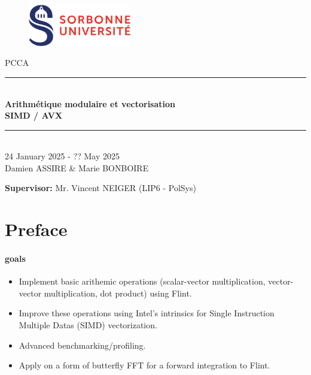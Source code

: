 \documentclass[a4paper]{article}
\begin{document}
\thispagestyle{plain}
\begin{titlepage}
    \begin{figure}[h]
        \centering
        \includegraphics[width=0.4\textwidth]{su.png}
    \end{figure}
    \vspace{1cm}

    \begin{center}
        {\LARGE PCCA}\\[0.3cm]
        \rule{\linewidth}{0.5mm} \\[0.4cm]
        {\huge \textbf{Arithmétique modulaire et vectorisation\\ SIMD / AVX}}\\[0.4cm]
        \rule{\linewidth}{0.5mm} \\[1cm]
        {\large 24 January 2025 - ?? May 2025}\\[3cm]

        {\Large Damien ASSIRE \& Marie BONBOIRE}


    \end{center}

    \vfill
\begin{flushleft}{\large
    \textbf{Supervisor:} Mr. Vincent NEIGER (LIP6 - PolSys)\\
    }
\end{flushleft}
\end{titlepage}
\newpage

\tableofcontents
\newpage

\section{Preface}

\paragraph{goals}
\begin{itemize}
    \item Implement basic arithemic operations (scalar-vector multiplication, vector-vector multiplication, dot product) using Flint.
    \item Improve these operations using Intel's intrinsics for Single Instruction Multiple Datas (SIMD) vectorization.
    \item Advanced benchmarking/profiling.
    \item Apply on a form of butterfly FFT for a forward integration to Flint.
\end{itemize}
\end{document}
